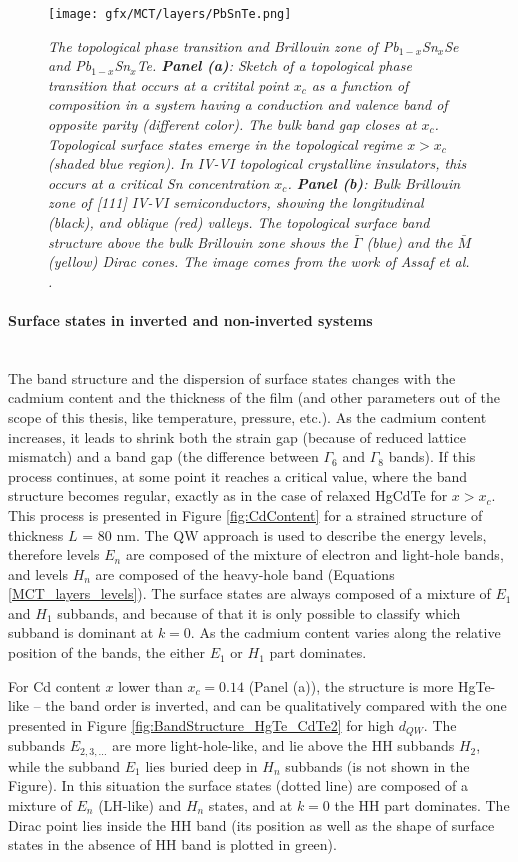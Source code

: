 \documentclass[titlepage,a4paper]{book}
\newcommand{\wciecie}{\quad\phantom{v}}
\newcommand{\myparagraph}[1]{\paragraph{#1}\mbox{}\\}
\begin{document}
\begin{figure}[H]
	\centering
	\texttt{[image: gfx/MCT/layers/PbSnTe.png]}
	\vspace{-10pt}
	\caption{\textit{The topological phase transition and Brillouin zone of Pb$_{1-x}$Sn$_x$Se and Pb$_{1-x}$Sn$_x$Te. \textbf{Panel (a)}: Sketch of a topological phase transition that occurs at a critital point $x_c$ as a function of composition in a system having a conduction and valence band of opposite parity (different color). The bulk band gap closes at $x_c$. Topological surface states emerge in the topological regime $x > x_c$ (shaded blue region). In IV-VI topological crystalline insulators, this occurs at a critical Sn concentration $x_c$. \textbf{Panel (b)}: Bulk Brillouin zone of [111] IV-VI semiconductors, showing the longitudinal (black), and oblique (red) valleys. The topological surface band structure above the bulk Brillouin zone shows the $\bar{\Gamma}$ (blue) and the $\bar{M}$ (yellow) Dirac cones. The image comes from the work of Assaf \textit{et al.} \cite{Assaf_MCT_layers1}.}}
	\label{fig:PbSnTe_MCT_layers}
\end{figure} 

\myparagraph{Surface states in inverted and non-inverted systems}
\wciecie
The band structure and the dispersion of surface states changes with the cadmium content and the thickness of the film (and other parameters out of the scope of this thesis, like temperature, pressure, etc.). As the cadmium content increases, it leads to shrink both the strain gap (because of reduced lattice mismatch) and a band gap (the difference between $\Gamma_6$ and $\Gamma_8$ bands). If this process continues, at some point it reaches a critical value, where the band structure becomes regular, exactly as in the case of relaxed HgCdTe for $x > x_c$. This process is presented in Figure \ref{fig:CdContent} for a strained structure of thickness $L$ = 80 nm. The QW approach is used to describe the energy levels, therefore levels $E_n$ are composed of the mixture of electron and light-hole bands, and levels $H_n$ are composed of the heavy-hole band (Equations \ref{MCT_layers_levels}). The surface states are always composed of a mixture of $E_1$ and $H_1$ subbands, and because of that it is only possible to classify which subband is dominant at $k = 0$. As the cadmium content varies along the relative position of the bands, the either $E_1$ or $H_1$ part dominates. 

For Cd content $x$ lower than $x_c = 0.14$ (Panel (a)), the structure is more HgTe-like -- the band order is inverted, and can be qualitatively compared with the one presented in Figure \ref{fig:BandStructure_HgTe_CdTe2} for high $d_{QW}$. The subbands $E_{2,3,...}$ are more light-hole-like, and lie above the HH subbands $H_2$, while the subband $E_1$ lies buried deep in $H_n$ subbands (is not shown in the Figure). In this situation the surface states (dotted line) are composed of a mixture of $E_n$ (LH-like) and $H_n$ states, and at $k = 0$ the HH part dominates. The Dirac point lies inside the HH band (its position as well as the shape of surface states in the absence of HH band is plotted in green).
\end{document}
